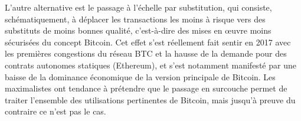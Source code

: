 L'autre alternative est le passage à l'échelle par substitution, qui consiste, schématiquement, à déplacer les transactions les moins à risque vers des substituts de moins bonnes qualité, c'est-à-dire des mises en œuvre moins sécurisées du concept Bitcoin. Cet effet s'est réellement fait sentir en 2017 avec les premières congestions du réseau BTC et la hausse de la demande pour des contrats autonomes statiques (Ethereum), et s'est notamment manifesté par une baisse de la dominance économique de la version principale de Bitcoin. Les maximalistes ont tendance à prétendre que le passage en surcouche permet de traiter l'ensemble des utilisations pertinentes de Bitcoin, mais jusqu'à preuve du contraire ce n'est pas le cas.

\printendnotes